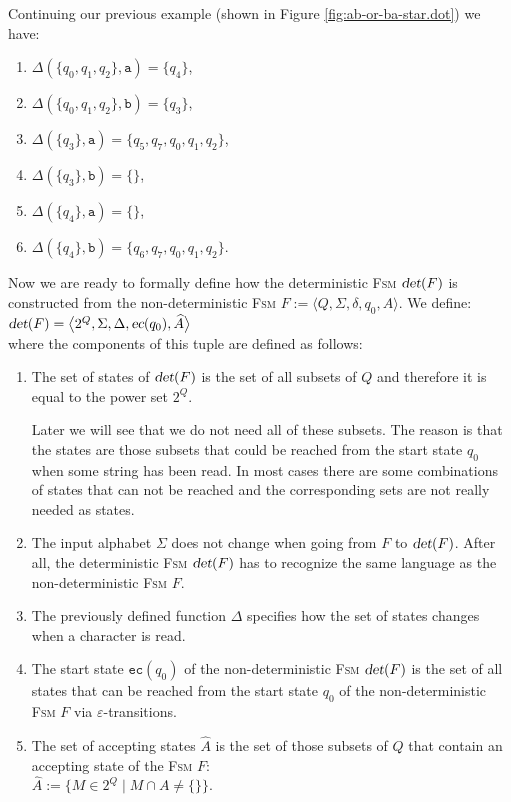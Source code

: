 \exampleEng
Continuing our previous example (shown in Figure \ref{fig:ab-or-ba-star.dot}) we have:
\begin{enumerate}
\item $\Delta(\{q_0, q_1, q_2\}, \texttt{a}) = \{ q_4 \}$,
\item $\Delta(\{q_0, q_1, q_2\}, \texttt{b}) = \{ q_3 \}$,
\item $\Delta(\{ q_3 \}, \texttt{a}) = \{ q_5, q_7, q_0, q_1, q_2 \}$,
\item $\Delta(\{ q_3 \}, \texttt{b}) = \{ \}$,
\item $\Delta(\{ q_4 \}, \texttt{a}) = \{ \}$,
\item $\Delta(\{ q_4 \}, \texttt{b}) = \{ q_6, q_7, q_0, q_1, q_2 \}$.
      \eox
\end{enumerate}
Now we are ready to formally define how the deterministic \textsc{Fsm} $\textsl{det}(F)$
is constructed from the non-deterministic \textsc{Fsm}
$F := \bigl\langle Q, \Sigma, \delta, q_0, A \bigr\rangle$.
We define: 
\\[0.2cm]
\hspace*{1.3cm}
$\textsl{det}(F) = \bigl\langle 2^Q, \Sigma, \Delta, \textsl{ec}(q_0), \widehat{A} \bigr\rangle$
\\[0.2cm]
where the components of this tuple are defined as follows:
\begin{enumerate}
\item The set of states of $\textsl{det}(F)$ is the set of all subsets of $Q$ and therefore it is equal to the power set
      $2^Q$.

      Later we will see that we do not need all of these subsets.
      The reason is that the states are those subsets that could be reached from the start state $q_0$ 
      when some string has been read.  In most cases there are some combinations of states that can not be reached
      and the corresponding sets are not really needed as states.
\item The input alphabet $\Sigma$ does not change when going from $F$ to $\textsl{det}(F)$.
      After all, the deterministic \textsc{Fsm}  $\textsl{det}(F)$ 
      has to recognize the same language as the non-deterministic \textsc{Fsm} $F$.
\item The previously defined function $\Delta$ specifies how the set of states changes when a
      character is read.
\item The start state $\texttt{ec}(q_0)$ of the non-deterministic \textsc{Fsm} $\textsl{det}(F)$ is the set of all states
      that can be reached from the start state $q_0$ of the non-deterministic \textsc{Fsm} $F$
      via $\varepsilon$-transitions.
\item The set of accepting states $\widehat{A}$ is the set of those subsets of $Q$ that contain an accepting
      state of the \textsc{Fsm} $F$:
      \\[0.2cm]
      \hspace*{1.3cm}
      $\widehat{A} := \bigl\{ M \in 2^Q \mid M \cap A \not= \{\} \bigl\}$.
\end{enumerate}

